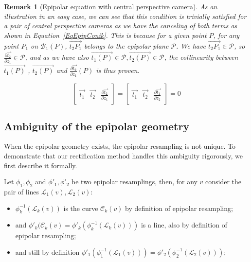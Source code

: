 \documentclass{ipol}
\newcommand{\Bund}[1]{\ensuremath{\mathcal{B}_{#1}}}
\newcommand{\BundO}{\Bund{1}}
\newcommand{\LineE}[1]{\ensuremath{\mathcal{L}_{#1}}}
\newcommand{\LineO}{\LineE{1}}
\newcommand{\LineT}{\LineE{2}}
\newcommand{\LineK}{\LineE{k}}
\newcommand{\CurveE}[1]{\ensuremath{\mathcal{C}_{#1}}}
\newcommand{\CurveK}{\CurveE{k}}
\newcommand{\BigV}[1]{\ensuremath{\overrightarrow{#1}}}
\newcommand{\TanO}[1]{\BigV{t_1#1}}
\newcommand{\TanT}[1]{\BigV{t_2#1}}
\newcommand{\DerPart}[2]{\frac{\partial #1}{\partial #2}}
\newtheorem{remark}{Remark}
\begin{document}
\begin{remark}[Epipolar equation with central perspective camera]
As an illustration in an easy case, we can see that this condition is trivially 
satisfied for a pair of central perspective cameras as we have the canceling of both terms as shown
in Equation~\eqref{EqEpipConik}. This is because for a given point $P$,
for any point $P_1$ on $\BundO(P)$, $\TanT{P_1}$ belongs to the epipolar
plane $\mathcal{P}$. We have $\TanT{P_1} \in \mathcal{P}$, so $\DerPart { \TanT{}}{z_1} \in \mathcal{P}$,
and as we have also $\TanO{(P)} \in  \mathcal{P}, \TanT{(P)} \in  \mathcal{P}$, the collinearity
between $\TanO{(P)}$ , $\TanT{(P)}$ and $\DerPart { \TanT{}}{z_1}(P)$ is thus proven.

\begin{equation}
\left[ \begin{array}{c|c|c}
\TanO{} & \TanT{}  & \DerPart { \TanT{}}{z_1}  
\end{array} \right]  
=\left[ \begin{array}{c|c|c}
\TanO{} & \TanT{}  & \DerPart { \TanO{}}{z_2}  
\end{array} \right]  
=0
\label{EqEpipConik}
\end{equation}
\end{remark}




\subsection{Ambiguity of the epipolar geometry}

When the epipolar geometry exists, the epipolar resampling is not unique. To demonstrate that our rectification method handles this ambiguity rigorously, we first describe it formally.


Let $\phi_1,\phi_2$ and  $\phi'_1,\phi'_2$ be two   epipolar resamplings, 
then, for any $v$ consider the pair of lines $\LineO(v),\LineT(v)$:

\begin{itemize}
   \item  $\phi_k^{-1}(\LineK(v))$ is the curve $\CurveK(v)$ by definition of epipolar resampling;
   \item  and $\phi'_k (\CurveK(v) = \phi'_k ( \phi_k^{-1}(\LineK(v)))$ is a line, also by definition of epipolar resampling;
   \item and still by definition $\phi'_1 ( \phi_1^{-1}(\LineO(v))) = \phi'_2 ( \phi_2^{-1}(\LineT(v)))$;
\end{itemize}
\end{document}
